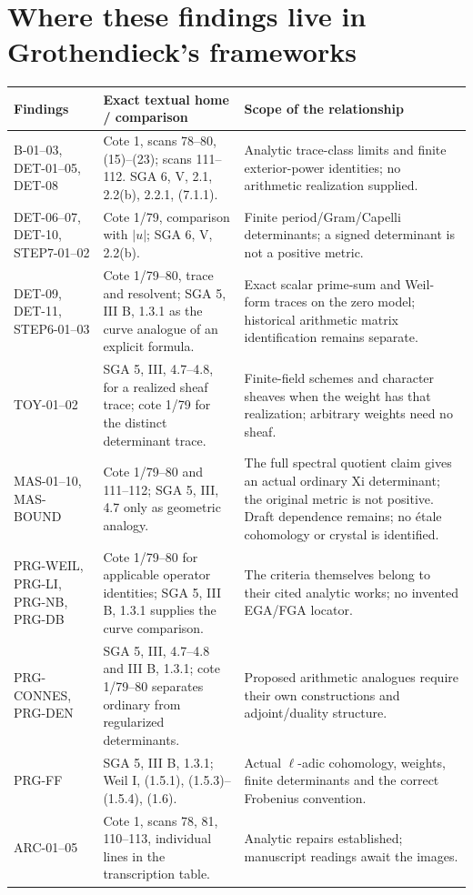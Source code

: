 \section{Where these findings live in Grothendieck's frameworks}
\begin{longtable}{>{\raggedright\arraybackslash}p{}>{\raggedright\arraybackslash}p{}>{\raggedright\arraybackslash}p{}}
\toprule
Findings & Exact textual home / comparison & Scope of the relationship\\\midrule\endhead
B-01--03, DET-01--05, DET-08 & Cote 1, scans 78--80, (15)--(23); scans 111--112. SGA 6, V, 2.1, 2.2(b), 2.2.1, (7.1.1). & Analytic trace-class limits and finite exterior-power identities; no arithmetic realization supplied.\\
DET-06--07, DET-10, STEP7-01--02 & Cote 1/79, comparison with $|u|$; SGA 6, V, 2.2(b). & Finite period/Gram/Capelli determinants; a signed determinant is not a positive metric.\\
DET-09, DET-11, STEP6-01--03 & Cote 1/79--80, trace and resolvent; SGA 5, III B, 1.3.1 as the curve analogue of an explicit formula. & Exact scalar prime-sum and Weil-form traces on the zero model; historical arithmetic matrix identification remains separate.\\
TOY-01--02 & SGA 5, III, 4.7--4.8, for a realized sheaf trace; cote 1/79 for the distinct determinant trace. & Finite-field schemes and character sheaves when the weight has that realization; arbitrary weights need no sheaf.\\
MAS-01--10, MAS-BOUND & Cote 1/79--80 and 111--112; SGA 5, III, 4.7 only as geometric analogy. & The full spectral quotient claim gives an actual ordinary Xi determinant; the original metric is not positive. Draft dependence remains; no \'etale cohomology or crystal is identified.\\
PRG-WEIL, PRG-LI, PRG-NB, PRG-DB & Cote 1/79--80 for applicable operator identities; SGA 5, III B, 1.3.1 supplies the curve comparison. & The criteria themselves belong to their cited analytic works; no invented EGA/FGA locator.\\
PRG-CONNES, PRG-DEN & SGA 5, III, 4.7--4.8 and III B, 1.3.1; cote 1/79--80 separates ordinary from regularized determinants. & Proposed arithmetic analogues require their own constructions and adjoint/duality structure.\\
PRG-FF & SGA 5, III B, 1.3.1; Weil I, (1.5.1), (1.5.3)--(1.5.4), (1.6). & Actual $\ell$-adic cohomology, weights, finite determinants and the correct Frobenius convention.\\
ARC-01--05 & Cote 1, scans 78, 81, 110--113, individual lines in the transcription table. & Analytic repairs established; manuscript readings await the images.\\\bottomrule
\end{longtable}
